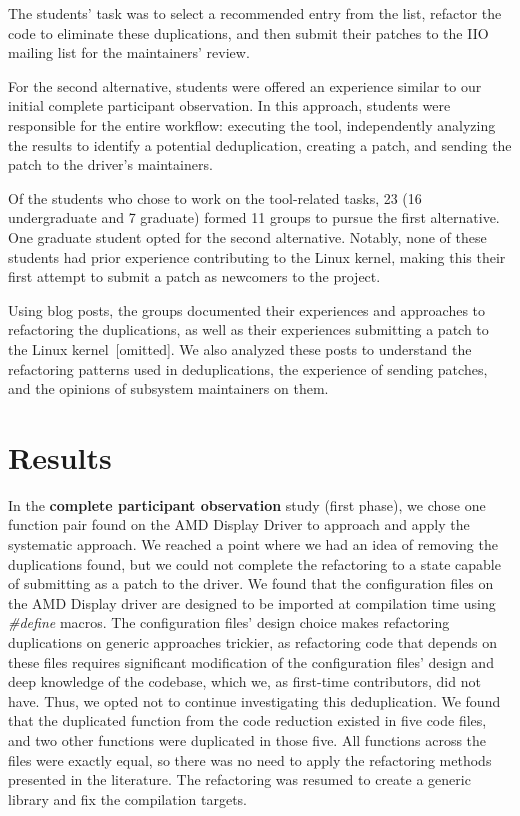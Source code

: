 \documentclass[sigconf]{acmart}
\begin{document}
The students' task was to select a recommended entry from the list, refactor the code to eliminate these duplications, and then submit their patches to the IIO mailing list for the maintainers' review.

For the second alternative, students were offered an experience similar to our initial complete participant observation. In this approach, students were responsible for the entire workflow: executing the tool, independently analyzing the results to identify a potential deduplication, creating a patch, and sending the patch to the driver's maintainers.

Of the students who chose to work on the tool-related tasks, 23 (16 undergraduate and 7 graduate) formed 11 groups to pursue the first alternative. One graduate student opted for the second alternative. Notably, none of these students had prior experience contributing to the Linux kernel, making this their first attempt to submit a patch as newcomers to the project.

Using blog posts, the groups documented their experiences and approaches to refactoring the duplications, as well as their experiences submitting a patch to the Linux kernel~[omitted]. We also analyzed these posts to understand the refactoring patterns used in deduplications, the experience of sending patches, and the opinions of subsystem maintainers on them.

\section{Results}

In the \textbf{complete participant observation} study (first phase), we chose one function pair found on the AMD Display Driver to approach and apply the systematic approach.
%
We reached a point where we had an idea of removing the duplications found, but we could not complete the refactoring to a state capable of submitting as a patch to the driver. We found that the configuration files on the AMD Display driver are designed to be imported at compilation time using \textit{\#define} macros. The configuration files' design choice makes refactoring duplications on generic approaches trickier, as refactoring code that depends on these files requires significant modification of the configuration files' design and deep knowledge of the codebase, which we, as first-time contributors, did not have. Thus, we opted not to continue investigating this deduplication. We found that the duplicated function from the code reduction existed in five code files, and two other functions were duplicated in those five. All functions across the files were exactly equal, so there was no need to apply the refactoring methods presented in the literature. The refactoring was resumed to create a generic library and fix the compilation targets.
\end{document}
